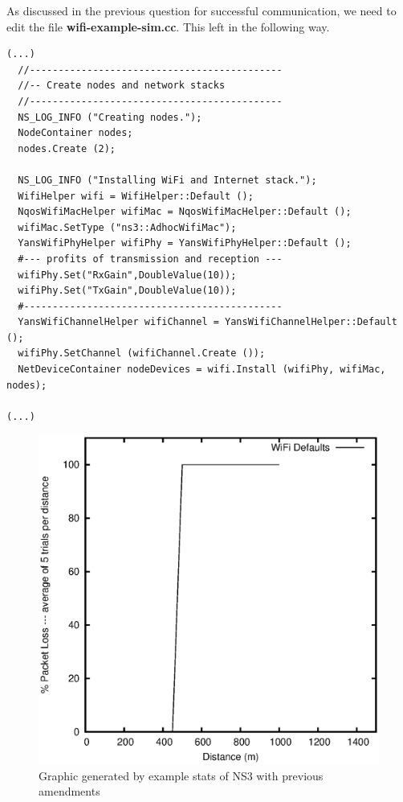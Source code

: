\documentclass[a4paper,10pt]{article}
\begin{document}
\singlespacing
As discussed in the previous question for successful communication, we need to edit the file \textbf{wifi-example-sim.cc}. This left in the following way.

\begin{lstlisting}[style=C]
(...)
  //--------------------------------------------
  //-- Create nodes and network stacks
  //--------------------------------------------
  NS_LOG_INFO ("Creating nodes.");
  NodeContainer nodes;
  nodes.Create (2);

  NS_LOG_INFO ("Installing WiFi and Internet stack.");
  WifiHelper wifi = WifiHelper::Default ();
  NqosWifiMacHelper wifiMac = NqosWifiMacHelper::Default ();
  wifiMac.SetType ("ns3::AdhocWifiMac");
  YansWifiPhyHelper wifiPhy = YansWifiPhyHelper::Default ();
  #--- profits of transmission and reception ---
  wifiPhy.Set("RxGain",DoubleValue(10));
  wifiPhy.Set("TxGain",DoubleValue(10));
  #---------------------------------------------
  YansWifiChannelHelper wifiChannel = YansWifiChannelHelper::Default ();
  wifiPhy.SetChannel (wifiChannel.Create ());
  NetDeviceContainer nodeDevices = wifi.Install (wifiPhy, wifiMac, nodes);

(...)
\end{lstlisting}


\begin{figure}[h]
        	\centering
    \includegraphics[scale=0.55]{wifi-400.eps}
    \caption{Graphic generated by example stats of NS3 with previous amendments}
    \label{fig:inicio}
        \end{figure}
\end{document}
